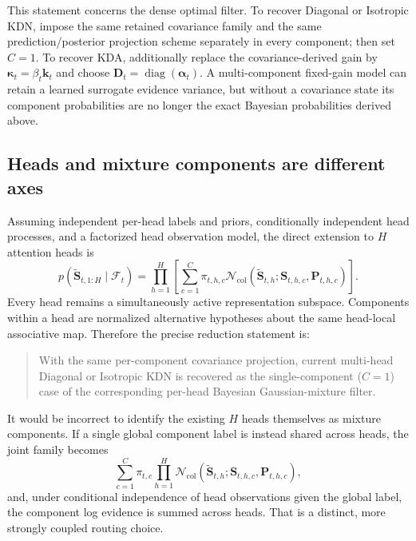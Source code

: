 \documentclass[11pt]{article}
\newcommand{\ve}[1]{\boldsymbol{#1}}
\newcommand{\diag}{\operatorname{diag}}
\newcommand{\Normal}{\mathcal{N}}
\begin{document}
This statement concerns the dense optimal filter.  To recover Diagonal or Isotropic KDN, impose
the same retained covariance family and the same prediction/posterior projection scheme separately
in every component; then set $C=1$.  To recover KDA, additionally replace the covariance-derived gain by
$\ve{\kappa}_t=\beta_t\ve{k}_t$ and choose
$\ve{D}_t=\diag(\ve{\alpha}_t)$.  A multi-component fixed-gain model can retain a learned
surrogate evidence variance, but without a covariance state its component probabilities are no
longer the exact Bayesian probabilities derived above.

\subsection{Heads and mixture components are different axes}

Assuming independent per-head labels and priors, conditionally independent head processes, and a
factorized head observation model, the direct extension to $H$ attention heads is
\begin{equation}
  p(\widetilde{\ve{S}}_{t,1:H}\mid\mathcal{F}_t)
  =\prod_{h=1}^{H}
    \left[
      \sum_{c=1}^{C}\pi_{t,h,c}
      \Normal_{\mathrm{col}}(
        \widetilde{\ve{S}}_{t,h};\ve{S}_{t,h,c},\ve{P}_{t,h,c})
    \right].
  \label{eq:kdn3-multihead-mixture}
\end{equation}
Every head remains a simultaneously active representation subspace.  Components within a head
are normalized alternative hypotheses about the same head-local associative map.  Therefore the
precise reduction statement is:
\begin{quote}
With the same per-component covariance projection, current multi-head Diagonal or Isotropic KDN
is recovered as the single-component ($C=1$) case of the corresponding per-head Bayesian
Gaussian-mixture filter.
\end{quote}
It would be incorrect to identify the existing $H$ heads themselves as mixture components.  If a
single global component label is instead shared across heads, the joint family becomes
\begin{equation}
  \sum_{c=1}^{C}\pi_{t,c}
  \prod_{h=1}^{H}
  \Normal_{\mathrm{col}}(
    \widetilde{\ve{S}}_{t,h};\ve{S}_{t,h,c},\ve{P}_{t,h,c}),
  \label{eq:kdn3-global-head-label}
\end{equation}
and, under conditional independence of head observations given the global label, the component
log evidence is summed across heads.  That is a distinct, more strongly coupled routing choice.
\end{document}
